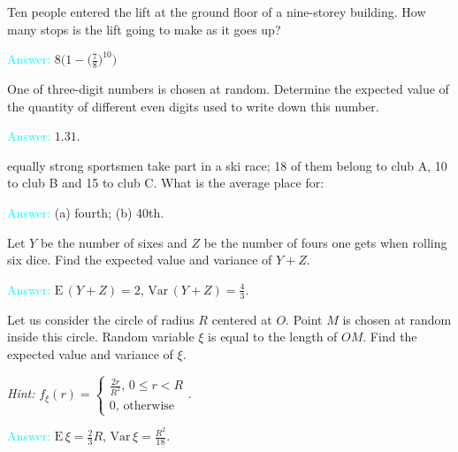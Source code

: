 \documentclass[14pt]{exam}
\def\Var{{\textrm{Var}}\,}
\def\E{{\textrm{E}}\,}
\begin{document}
\begin{questions}
		\question
		Ten people entered the lift at the ground floor of a nine-storey building. How many stops is the lift going to make as it goes up?
		
		\textcolor{cyan}{Answer:} $8 \biggr(1 - \bigr(\frac{7}{8}\bigr)^{10}\biggr)$
		
		\question
		One of three-digit numbers is chosen at random. Determine the expected value of the quantity of different even digits used to write down this number.
		
		\textcolor{cyan}{Answer:} $1.31$.
		
		 equally strong sportsmen take part in a ski race; 18 of them belong to club A, 10 to club B and 15 to club C. What is the average place for:
		
		
		\textcolor{cyan}{Answer:} (a) fourth; (b) 40th.
		
		\question
		Let $Y$ be the number of sixes and $Z$ be the number of fours one gets when rolling six dice. Find the expected value and variance of $Y + Z$.
		
		\textcolor{cyan}{Answer:} $\E(Y+Z) = 2$, $\Var(Y+Z) = \frac{4}{3}$.
		
		
		
		\question
		Let us consider the circle of radius $R$ centered at $O$. Point $M$ is chosen at random inside this circle. Random variable $\xi$ is equal to the length of $OM$. Find the expected value and variance of $\xi$.
		
		\textit{Hint:} $f_\xi(r) = \begin{cases}\frac{2r}{R^2},\, 0 \leq r < R\\ 0,\, \text{otherwise}\end{cases}$.
		
		\textcolor{cyan}{Answer:} $\E\xi = \frac{2}{3}R$, $\Var\xi = \frac{R^2}{18}$.
		

\end{questions}
\end{document}
